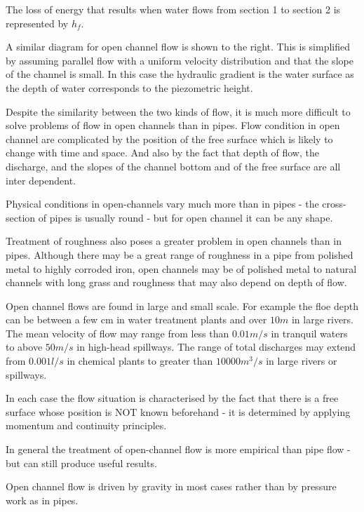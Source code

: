 \documentclass[a4paper, 12pt, british]{article} %
\numberwithin{equation}{section}
\numberwithin{figure}{section}
\numberwithin{table}{section}
\begin{document}
The loss of energy that results when water flows from section 1 to section 2 is represented by $h_f$.

A similar diagram for open channel flow is shown to the right. This is simplified by assuming parallel flow with a uniform velocity distribution and that the slope of the channel is small. In this case the hydraulic gradient is the water surface as the depth of water corresponds to the piezometric height.

Despite the similarity between the two kinds of flow, it is much more difficult to solve problems of flow in open channels than in pipes. Flow condition in open channel are complicated by the position of the free surface which is likely to change with time and space. And also by the fact that depth of flow, the discharge, and the slopes of the channel bottom and of the free surface are all inter dependent.

Physical conditions in open-channels vary much more than in pipes - the cross-section of pipes is usually round - but for open channel it can be any shape.

Treatment of roughness also poses a greater problem in open channels than in pipes. Although there may be a great range of roughness in a pipe from polished metal to highly corroded iron, open channels may be of polished metal to natural channels with long grass and roughness that may also depend on depth of flow.

Open channel flows are found in large and small scale. For example the floe depth can be between a few cm in water treatment plants and over $10m$ in large rivers. The mean velocity of flow may range from less than $0.01 m/s$ in tranquil waters to above $50 m/s$ in high-head spillways. The range of total discharges may extend from $0.001 l/s$ in chemical plants to greater than $10000 m^3/s$ in large rivers or spillways. 

In each case the flow situation is characterised by the fact that there is a free surface whose position is NOT known beforehand - it is determined by applying momentum and continuity principles.

In general the treatment of open-channel flow is more empirical than pipe flow - but can still produce useful results.

Open channel flow is driven by gravity in most cases rather than by pressure work as in pipes.
\end{document}
